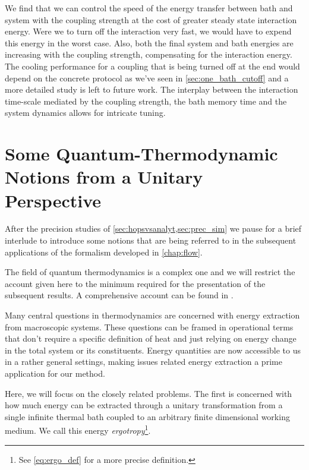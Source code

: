 We find that we can control the speed of the energy transfer between
bath and system with the coupling strength at the cost of greater
steady state interaction energy. Were we to turn off the interaction
very fast, we would have to expend this energy in the worst
case. Also, both the final system and bath energies are increasing
with the coupling strength, compensating for the interaction energy.
The cooling performance for a coupling that is being turned off at the
end would depend on the concrete protocol as we've seen in
\cref{sec:one_bath_cutoff} and a more detailed study is left to future
work. The interplay between the interaction time-scale mediated by the
coupling strength, the bath memory time and the system dynamics allows
for intricate tuning.



\section{Some Quantum-Thermodynamic Notions from a Unitary Perspective}
\label{sec:basic_thermo}
After the precision studies of \cref{sec:hopsvsanalyt,sec:prec_sim} we
pause for a brief interlude to introduce some notions that are being
referred to in the subsequent applications of the formalism developed
in \cref{chap:flow}.

The field of quantum thermodynamics is a complex one and we will
restrict the account given here to the minimum required for the
presentation of the subsequent results. A comprehensive account can be
found in
\cite{Binder2018,Kurizki2021Dec,Talkner2020Oct,Vinjanampathy2016Oct}.

Many central questions in thermodynamics are concerned with energy
extraction from macroscopic systems. These questions can be framed in
operational terms that don't require a specific definition of heat and
just relying on energy change in the total system or its
constituents. Energy quantities are now accessible to us in a rather
general settings, making issues related energy extraction a prime
application for our method.

Here, we will focus on the closely related problems. The first is
concerned with how much energy can be extracted through a unitary
transformation from a single infinite thermal bath coupled to an
arbitrary finite dimensional working medium. We call this energy
\emph{ergotropy}\footnote{See \cref{eq:ergo_def} for a more precise definition.}.

